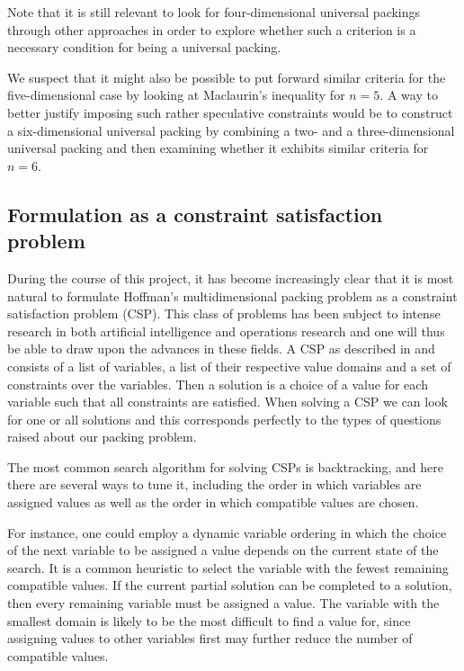 Note that it is still relevant to look for four-dimensional universal packings through other approaches in order to explore whether such a criterion is a necessary condition for being a universal packing.

We suspect that it might also be possible to put forward similar criteria for the five-dimensional case by looking at Maclaurin's inequality for $n = 5$. A way to better justify imposing such rather speculative constraints would be to construct a six-dimensional universal packing by combining a two- and a three-dimensional universal packing and then examining whether it exhibits similar criteria for $n = 6$.

\subsection{Formulation as a constraint satisfaction problem}
\noindent During the course of this project, it has become increasingly clear that it is most natural to formulate Hoffman's multidimensional packing problem as a constraint satisfaction problem (CSP). This class of problems has been subject to intense research in both artificial intelligence and operations research and one will thus be able to draw upon the advances in these fields. A CSP as described in \cite{CSP1999} and \cite{bartak1998} consists of a list of variables, a list of their respective value domains and a set of constraints over the variables. Then a solution is a choice of a value for each variable such that all constraints are satisfied. When solving a CSP we can look for one or all solutions and this corresponds perfectly to the types of questions raised about our packing problem.

The most common search algorithm for solving CSPs is backtracking, and here there are several ways to tune it, including the order in which variables are assigned values as well as the order in which compatible values are chosen.

For instance, one could employ a dynamic variable ordering in which the choice of the next variable to be assigned a value depends on the current state of the search. It is a common heuristic to select the variable with the fewest remaining compatible values. If the current partial solution can be completed to a solution, then every remaining variable must be assigned a value. The variable with the smallest domain is likely to be the most difficult to find a value for, since assigning values to other variables first may further reduce the number of compatible values.

